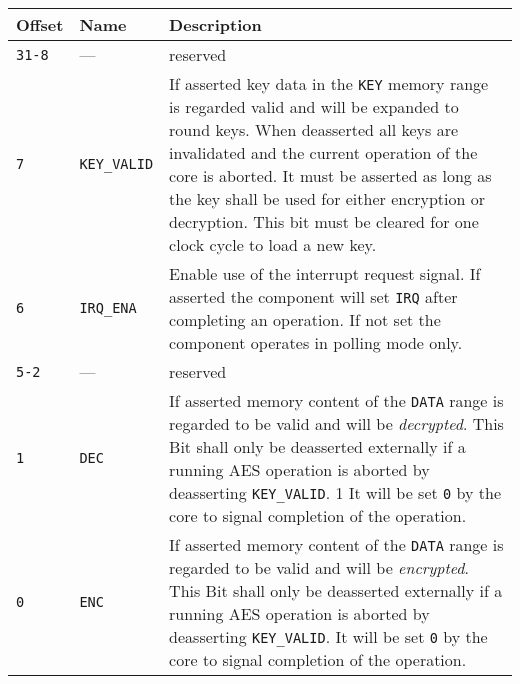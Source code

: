 \documentclass{ruschidoc}
\begin{document}
\begin{tabularx}{\textwidth}{|p{13mm}|p{18mm} |X|}
  \hline
  \bf{Offset} 	  & \bf{Name} & \bf{Description}\\ \hline
  \texttt{31-8} & --- & reserved \\ \hline 	 
  \texttt{7} 	 &\texttt{KEY\_VALID} &If asserted key data in the \texttt{KEY} memory range is regarded valid and will be expanded to round keys. 
	When deasserted all keys are invalidated and the current operation of the core is aborted. It must be asserted as long as the key shall be 
	used for either encryption or decryption. This bit must be cleared for one clock cycle to load a new key. \\ \hline
  \texttt{6}   & \texttt{IRQ\_ENA}  & Enable use of the interrupt request signal. If asserted the component will set \texttt{IRQ} after 
					completing an operation. If not set the component operates in polling mode only.\\ \hline	 
  \texttt{5-2}   & --- &reserved  \\ \hline	 
  \texttt{1} 	&  \texttt{DEC} \footnotemark[1] &  If asserted memory content of the \texttt{DATA} range is regarded to be valid and will be 
	\emph{decrypted}. This Bit shall only be deasserted externally if a running AES operation is aborted by deasserting \texttt{KEY\_VALID}. 1
	It will be set \texttt{0} by the core to signal completion of the operation.\\ \hline	 
  \texttt{0} 	&  \texttt{ENC} \footnotemark[1] & If asserted memory content of the \texttt{DATA} range is regarded to be valid and will be 
	\emph{encrypted}. This Bit shall only be deasserted externally if a running AES operation is aborted by deasserting \texttt{KEY\_VALID}.
	 It will be set \texttt{0} by the core to signal completion of the operation. \\ \hline	 
\end{tabularx}
\label{tab:ctrlreg}
\end{document}
